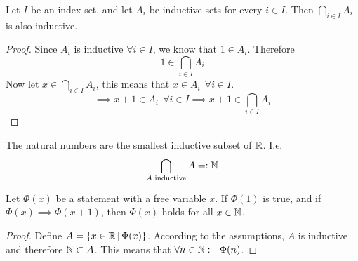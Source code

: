 \documentclass[../../script.tex]{subfiles}
\begin{document}
\begin{lem}
Let $I$ be an index set, and let $A_i$ be inductive sets for every $i \in I$. Then $\bigcap_{i \in I} A_i$ is also inductive.
\end{lem}
\begin{proof}
Since $A_i$ is inductive $\forall i \in I$, we know that $1 \in A_i$. Therefore 
\begin{equation}
	1 \in \bigcap_{i \in I} A_i
\end{equation}
Now let $x \in \bigcap_{i \in I} A_i$, this means that $x \in A_i ~~\forall i \in I$.
\begin{equation}
	\implies x + 1 \in A_i ~~\forall i \in I \implies x + 1 \in \bigcap_{i \in I} A_i
\end{equation}
\end{proof}

\begin{defi}
The natural numbers are the smallest inductive subset of $\mathbb{R}$. I.e.
\[
	\bigcap_{A \text{ inductive}} A =: \mathbb{N}
\]
\end{defi}

\begin{thm}
Let $\Phi(x)$ be a statement with a free variable $x$. If $\Phi(1)$ is true, and if $\Phi(x) \implies \Phi(x + 1)$, then $\Phi(x)$ holds for all $x \in \mathbb{N}$.
\end{thm}
\begin{proof}
Define $A = \{x \in \mathbb{R} \,\vert\, \Phi(x)\}$. According to the assumptions, $A$ is inductive and therefore $\mathbb{N} \subset A$. This means that $\forall n \in \mathbb{N}: ~~\Phi(n)$.
\end{proof}
\end{document}
